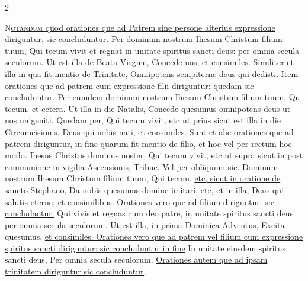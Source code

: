\newpage

\begin{multicols}{2}


{\color{Red} }
\lettrine[lines=2]{\zallmancaps \color{Red} N}{}\ul{\textsc{otandum} quod orationes que ad Patrem sine persone alterius expressione diriguntur, sic concluduntur.}
\newline Per dominum nostrum Ihesum Christum filium tuum, Qui tecum vivit et regnat in unitate spiritus sancti deus: per omnia secula seculorum. \ul{Ut est illa de Beata Virgine,} Concede nos, \ul{et consimiles. Similiter et illa in qua fit mentio de Trinitate,} \hyperlink{omnipotens-trinitas}{Omnipotens sempiterne deus qui dedisti.}
\newline \ul{Item orationes que ad patrem cum expressione filii diriguntur: quedam sic concluduntur.}
\newline Per eumdem dominum nostrum Ihesum Christum filium tuum, Qui tecum. \ul{et cetera. Ut illa in die Natalis,} \hyperlink{concede-nativitas}{Concede quesumus omnipotens deus ut nos unigeniti.} \ul{Quedam per,} Qui tecum vivit, \ul{etc ut prius sicut est illa in die Circumcisionis.} \hyperlink{deus-nobis-circumcisionis}{Deus qui nobis nati,} \ul{et consimiles. Sunt et alie orationes que ad patrem diriguntur, in fine quarum fit mentio de filio, et hoc vel per rectum hoc modo.}
\newline Ihesus Christus dominus noster, Qui tecum vivit, \ul{etc ut supra sicut in post communione in vigilia Ascensionis,} Tribue. \ul{Vel per obliquum sic.}
\newline Dominum nostrum Ihesum Christum filium tuum, Qui tecum, \ul{etc, sicut in oratione de sancto Stephano,} Da nobis quesumus domine imitari. \ul{etc, et in illa,} Deus qui salutis eterne, \ul{et consimilibus. Orationes vero que ad filium diriguntur: sic concludantur.}
\newline Qui vivis et regnas cum deo patre, in unitate spiritus sancti deus per omnia secula seculorum. \ul{Ut est illa, in prima Dominica Adventus,} Excita quesumus, \ul{et consimiles. Orationes vero que ad patrem vel filium cum expressione spiritus sancti diriguntur: sic concluduntur in fine}
\newline In unitate eiusdem spiritus sancti deus, Per omnia secula seculorum. \ul{Orationes autem que ad ipsam trinitatem diriguntur sic concluduntur,}

\end{multicols}
